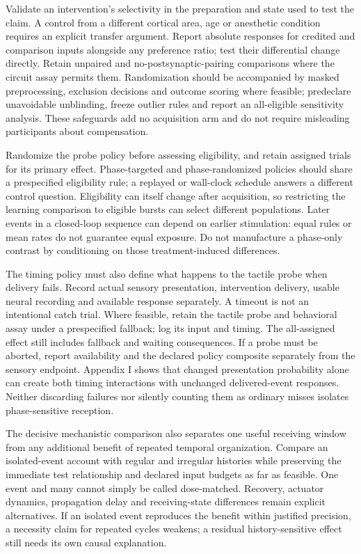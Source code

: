 \documentclass[
  american,
  11pt,
  letterpaper,
]{article}
\begin{document}
Validate an intervention's selectivity in the preparation and state used to test the claim. A control from a different cortical area, age or anesthetic condition requires an explicit transfer argument. Report absolute responses for credited and comparison inputs alongside any preference ratio; test their differential change directly. Retain unpaired and no-postsynaptic-pairing comparisons where the circuit assay permits them. Randomization should be accompanied by masked preprocessing, exclusion decisions and outcome scoring where feasible; predeclare unavoidable unblinding, freeze outlier rules and report an all-eligible sensitivity analysis. These safeguards add no acquisition arm and do not require misleading participants about compensation.

Randomize the probe policy before assessing eligibility, and retain assigned trials for its primary effect. Phase-targeted and phase-randomized policies should share a prespecified eligibility rule; a replayed or wall-clock schedule answers a different control question. Eligibility can itself change after acquisition, so restricting the learning comparison to eligible bursts can select different populations. Later events in a closed-loop sequence can depend on earlier stimulation: equal rules or mean rates do not guarantee equal exposure. Do not manufacture a phase-only contrast by conditioning on those treatment-induced differences.

The timing policy must also define what happens to the tactile probe when delivery fails. Record actual sensory presentation, intervention delivery, usable neural recording and available response separately. A timeout is not an intentional catch trial. Where feasible, retain the tactile probe and behavioral assay under a prespecified fallback; log its input and timing. The all-assigned effect still includes fallback and waiting consequences. If a probe must be aborted, report availability and the declared policy composite separately from the sensory endpoint. Appendix I shows that changed presentation probability alone can create both timing interactions with unchanged delivered-event responses. Neither discarding failures nor silently counting them as ordinary misses isolates phase-sensitive reception.

The decisive mechanistic comparison also separates one useful receiving window from any additional benefit of repeated temporal organization. Compare an isolated-event account with regular and irregular histories while preserving the immediate test relationship and declared input budgets as far as feasible. One event and many cannot simply be called dose-matched. Recovery, actuator dynamics, propagation delay and receiving-state differences remain explicit alternatives. If an isolated event reproduces the benefit within justified precision, a necessity claim for repeated cycles weakens; a residual history-sensitive effect still needs its own causal explanation.
\end{document}
